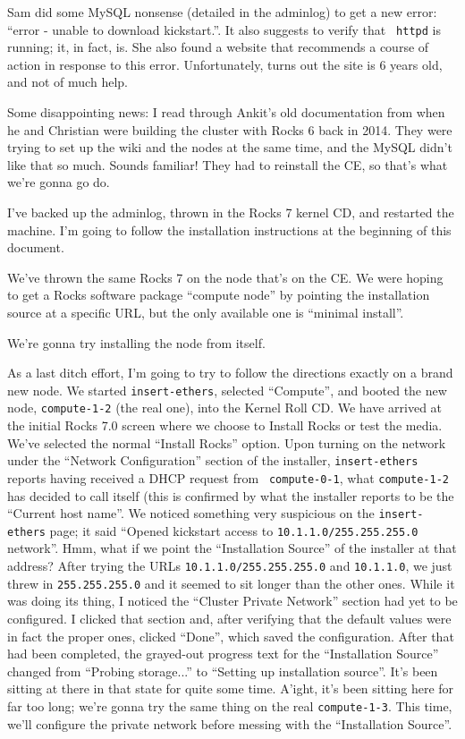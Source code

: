 \documentclass[12pt]{article}
\begin{document}
\qq Sam did some MySQL nonsense (detailed in the adminlog) to get a new error:
``error - unable to download kickstart.''. It also suggests to verify that {\tt
  httpd} is running; it, in fact, is. She also found a website that recommends a
course of action in response to this error. Unfortunately, turns out the site is
6 years old, and not of much help.

\qq Some disappointing news: I read through Ankit's old documentation from when
he and Christian were building the cluster with Rocks 6 back in 2014. They were
trying to set up the wiki and the nodes at the same time, and the MySQL didn't
like that so much. Sounds familiar! They had to reinstall the CE, so that's what
we're gonna go do.

\qq I've backed up the adminlog, thrown in the Rocks 7 kernel CD, and restarted
the machine. I'm going to follow the installation instructions at the beginning
of this document.

\qq We've thrown the same Rocks 7 on the node that's on the CE. We were hoping
to get a Rocks software package ``compute node'' by pointing the installation
source at a specific URL, but the only available one is ``minimal install''.

\qq We're gonna try installing the node from itself.

\qq As a last ditch effort, I'm going to try to follow the directions exactly on
a brand new node. We started {\tt insert-ethers}, selected ``Compute'', and
booted the new node, {\tt compute-1-2} (the real one), into the Kernel Roll
CD. We have arrived at the initial Rocks 7.0 screen where we choose to Install
Rocks or test the media. We've selected the normal ``Install Rocks'' option.
Upon turning on the network under the ``Network Configuration'' section of the
installer, {\tt insert-ethers} reports having received a DHCP request from {\tt
  compute-0-1}, what {\tt compute-1-2} has decided to call itself (this is
confirmed by what the installer reports to be the ``Current host name''.  We
noticed something very suspicious on the {\tt insert-ethers} page; it said
``Opened kickstart access to {\tt 10.1.1.0/255.255.255.0} network''. Hmm, what
if we point the ``Installation Source'' of the installer at that address?  After
trying the URLs {\tt 10.1.1.0/255.255.255.0} and {\tt 10.1.1.0}, we just threw
in {\tt 255.255.255.0} and it seemed to sit longer than the other ones. While it
was doing its thing, I noticed the ``Cluster Private Network'' section had yet
to be configured. I clicked that section and, after verifying that the default
values were in fact the proper ones, clicked ``Done'', which saved the
configuration. After that had been completed, the grayed-out progress text for
the ``Installation Source'' changed from ``Probing storage...'' to ``Setting up
installation source''. It's been sitting at there in that state for quite some
time. A'ight, it's been sitting here for far too long; we're gonna try the same
thing on the real {\tt compute-1-3}. This time, we'll configure the private
network before messing with the ``Installation Source''.
\end{document}
